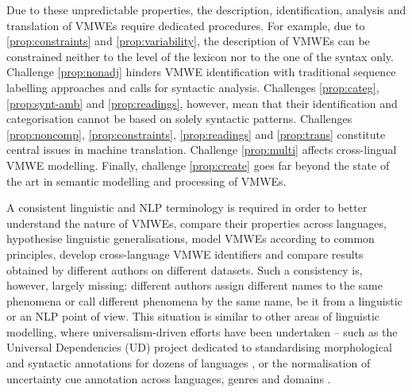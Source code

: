 \documentclass[output=paper,modfonts]{langscibook}
\begin{document}
Due to these unpredictable properties, %
the description, identification, analysis and translation of VMWEs require dedicated procedures. For example, due to \ref{prop:constraints} and \ref{prop:variability}, the description of VMWEs can be constrained neither to the level of the lexicon nor to the one of the syntax only.   
Challenge \ref{prop:nonadj} hinders VMWE identification with traditional sequence labelling approaches and calls for syntactic analysis. Challenges \ref{prop:categ}, \ref{prop:synt-amb} and \ref{prop:readings},  however, mean that their identification and categorisation cannot be based on solely syntactic patterns. Challenges \ref{prop:noncomp}, \ref{prop:constraints}, \ref{prop:readings} and \ref{prop:trans} constitute central issues in machine translation. %
Challenge \ref{prop:multi} affects cross-lingual VMWE modelling. Finally, challenge \ref{prop:create} goes far beyond the state of the art in semantic modelling and processing of VMWEs.


A consistent linguistic and NLP terminology is required in order to better understand the nature of VMWEs, compare their properties across languages, hypothesise linguistic generalisations, model VMWEs according to common principles, develop cross-language VMWE identifiers and compare results obtained by different authors on different datasets. Such a consistency is, however, largely missing: different authors assign different names to the same phenomena or call different phenomena by the same name, be it from a linguistic or an NLP point of view. This situation is similar to other areas of linguistic modelling, where universalism-driven efforts have been undertaken -- such as the Universal Dependencies (UD) project dedicated to standardising morphological and syntactic annotations for dozens of languages \citep{univdep}, or the normalisation of uncertainty cue annotation across languages, genres and domains \citep{cl_uc}. 

 
\end{document}
